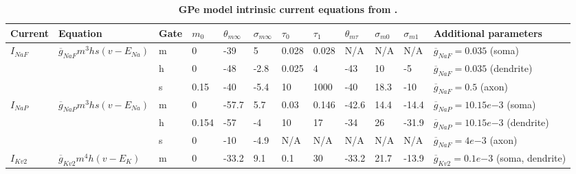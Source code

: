 %
%
%

%

\begin{table}[ht]
\centering
\caption{
{\bf GPe model intrinsic current equations from \cite{gunay_channel_2008}.}}
\begin{adjustbox}{width=\textwidth} %
\begin{tabular}{llllllllllll}
\toprule
Current                & Equation                                           & Gate & $ m_0 $ & $ \theta_{m \infty} $ & $ \sigma_{m \infty} $ & $ \tau_0 $ & $ \tau_1 $ & $ \theta_{m \tau} $ & $ \sigma_{m0} $ & $ \sigma_{m1} $ & Additional parameters \\ \midrule
%
$ I_{NaF} $            & $ \overline{g}_{NaF} m^3 h s (v - E_{Na}) $        & m    & 0       & -39                   & 5                     & 0.028      & 0.028      & N/A                 & N/A             & N/A             & $ \overline{g}_{NaF} = 0.035 $ (soma)  \\
                      &                                                    & h    & 0       & -48                   & -2.8                  & 0.025      & 4          & -43                 & 10              & -5              & $ \overline{g}_{NaF} = 0.035 $ (dendrite) \\
                      &                                                    & s    & 0.15    & -40                   & -5.4                  & 10         & 1000       & -40                 & 18.3            & -10             & $ \overline{g}_{NaF} = 0.5 $ (axon) \\ \midrule
%
$ I_{NaP} $            & $ \overline{g}_{NaP} m^3 h s (v - E_{Na}) $        & m    & 0       & -57.7                 & 5.7                   & 0.03       & 0.146      & -42.6               & 14.4            & -14.4           & $ \overline{g}_{NaP} = 10.15 e{-3} $ (soma) \\
                      &                                                    & h    & 0.154   & -57                   & -4                    & 10         & 17         & -34                 & 26              & -31.9           & $ \overline{g}_{NaP} = 10.15 e{-3} $ (dendrite)  \\
                      &                                                    & s    & 0       & -10                   & -4.9                  & N/A        & N/A        & N/A                 & N/A             & N/A             & $ \overline{g}_{NaF} = 4 e{-3} $ (axon) \\ \midrule
%
$ I_{Kv2} $            & $ \overline{g}_{Kv2} m^4 h (v - E_{K}) $           & m    & 0       & -33.2                 & 9.1                   & 0.1        & 30         & -33.2               & 21.7            & -13.9           & $ \overline{g}_{Kv2} = 0.1 e{-3} $ (soma, dendrite)  \\

\end{tabular}
\end{adjustbox}
\end{table}
